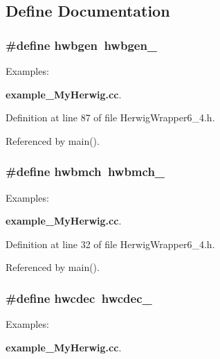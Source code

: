 \subsection{Define Documentation}
\subsubsection{\setlength{\rightskip}{0pt plus 5cm}\#define hwbgen~hwbgen\_\-}\label{HerwigWrapper6__4_8h_fb8560bbe7bed53ce8187553ba60a795}


\begin{Desc}
\item[Examples: ]\par
{\bf example\_\-My\-Herwig.cc}.\end{Desc}


Definition at line 87 of file Herwig\-Wrapper6\_\-4.h.

Referenced by main().
\subsubsection{\setlength{\rightskip}{0pt plus 5cm}\#define hwbmch~{\bf hwbmch\_\-}}\label{HerwigWrapper6__4_8h_8f5abf04e24bea756b40e37cbacfbb5c}


\begin{Desc}
\item[Examples: ]\par
{\bf example\_\-My\-Herwig.cc}.\end{Desc}


Definition at line 32 of file Herwig\-Wrapper6\_\-4.h.

Referenced by main().
\subsubsection{\setlength{\rightskip}{0pt plus 5cm}\#define hwcdec~hwcdec\_\-}\label{HerwigWrapper6__4_8h_d97d1a3ef44513455e1bbb344f38eb69}


\begin{Desc}
\item[Examples: ]\par
{\bf example\_\-My\-Herwig.cc}.\end{Desc}


